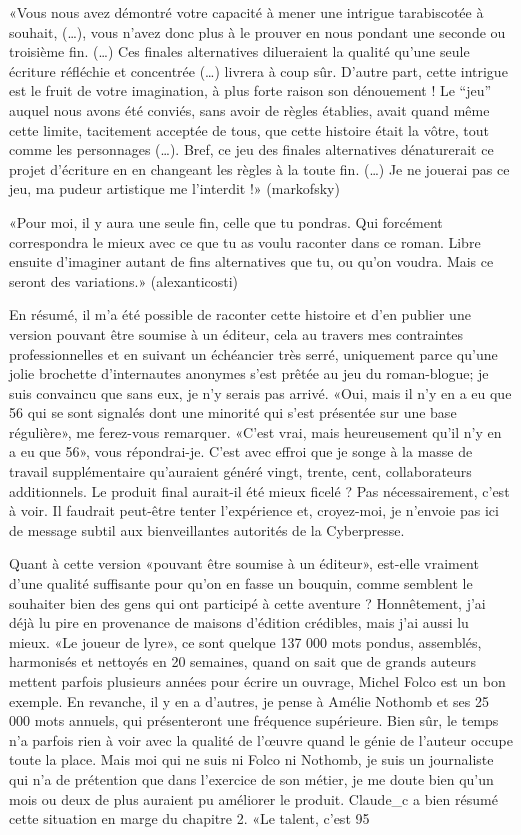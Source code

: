 \begin{Postface}
    «Vous nous avez démontré votre capacité à mener une intrigue tarabiscotée à souhait, (…), vous n’avez donc plus à le prouver en nous pondant une seconde ou troisième fin. (…) Ces finales alternatives dilueraient la qualité qu’une seule écriture réfléchie et concentrée (…) livrera à coup sûr. D’autre part, cette intrigue est le fruit de votre imagination, à plus forte raison son dénouement ! Le “jeu” auquel nous avons été conviés, sans avoir de règles établies, avait quand même cette limite, tacitement acceptée de tous, que cette histoire était la vôtre, tout comme les personnages (…). Bref, ce jeu des finales alternatives dénaturerait ce projet d’écriture en en changeant les règles à la toute fin. (…) Je ne jouerai pas ce jeu, ma pudeur artistique me l’interdit !» (markofsky)

    «Pour moi, il y aura une seule fin, celle que tu pondras. Qui forcément correspondra le mieux avec ce que tu as voulu raconter dans ce roman. Libre ensuite d’imaginer autant de fins alternatives que tu, ou qu’on voudra. Mais ce seront des variations.» (alexanticosti)

En résumé, il m’a été possible de raconter cette histoire et d’en publier une version pouvant être soumise à un éditeur, cela au travers mes contraintes professionnelles et en suivant un échéancier très serré, uniquement parce qu’une jolie brochette d’internautes anonymes s’est prêtée au jeu du roman-blogue; je suis convaincu que sans eux, je n’y serais pas arrivé. «Oui, mais il n’y en a eu que 56 qui se sont signalés dont une minorité qui s’est présentée sur une base régulière», me ferez-vous remarquer. «C’est vrai, mais heureusement qu’il n’y en a eu que 56», vous répondrai-je. C’est avec effroi que je songe à la masse de travail supplémentaire qu’auraient généré vingt, trente, cent, collaborateurs additionnels. Le produit final aurait-il été mieux ficelé ? Pas nécessairement, c’est à voir. Il faudrait peut-être tenter l’expérience et, croyez-moi, je n’envoie pas ici de message subtil aux bienveillantes autorités de la Cyberpresse.

Quant à cette version «pouvant être soumise à un éditeur», est-elle vraiment d’une qualité suffisante pour qu’on en fasse un bouquin, comme semblent le souhaiter bien des gens qui ont participé à cette aventure ? Honnêtement, j’ai déjà lu pire en provenance de maisons d’édition crédibles, mais j’ai aussi lu mieux. «Le joueur de lyre», ce sont quelque 137 000 mots pondus, assemblés, harmonisés et nettoyés en 20 semaines, quand on sait que de grands auteurs mettent parfois plusieurs années pour écrire un ouvrage, Michel Folco est un bon exemple. En revanche, il y en a d’autres, je pense à Amélie Nothomb et ses 25 000 mots annuels, qui présenteront une fréquence supérieure. Bien sûr, le temps n’a parfois rien à voir avec la qualité de l’œuvre quand le génie de l’auteur occupe toute la place. Mais moi qui ne suis ni Folco ni Nothomb, je suis un journaliste qui n’a de prétention que dans l’exercice de son métier, je me doute bien qu’un mois ou deux de plus auraient pu améliorer le produit. Claude_c a bien résumé cette situation en marge du chapitre 2. «Le talent, c’est 95%


\end{Postface}
